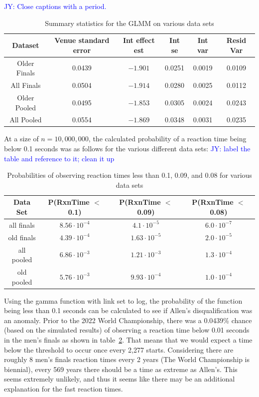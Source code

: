 \documentclass[12pt, letterpaper, titlepage]{article}
\newcommand{\jy}[1]{\textcolor{blue}{JY: #1}}
\begin{document}
\jy{Close captions with a period.}
\begin{table}
  \centering
  \begin{tabular}{c c c c c c}
      \toprule
      Dataset & Venue standard error & Int effect est & Int se & Int var & Resid Var \\
      \midrule
      Older Finals & 0.0439 & $-1.901$ & 0.0251 & 0.0019 & 0.0109 \\
      All Finals & 0.0504 & $-1.914$ & 0.0280 & 0.0025 & 0.0112 \\
      Older Pooled & 0.0495 & $-1.853$ & 0.0305 & 0.0024 & 0.0243 \\
      All Pooled & 0.0554 & $-1.869$ & 0.0348 & 0.0031 & 0.0235 \\
      \bottomrule
  \end{tabular}
  \caption{Summary statistics for the GLMM on various data sets}
  \label{tab:Gamma_parameters}
\end{table}

At a size of $n=10,000,000$, the calculated probability of a reaction
time being below 0.1 seconds was as follows for the various different data sets:
\jy{label the table and reference to it; clean it up}
\begin{table}
  \centering
  \begin{tabular}{c c c c} 
   \toprule
   Data Set & P(RxnTime $<$ 0.1) & P(RxnTime $<$ 0.09) & P(RxnTime $<$ 0.08) \\ 
   \midrule
   all finals & $8.56\cdot10^{-4}$ & $4.1\cdot10^{-5}$ & $6.0\cdot10^{-7}$ \\ 
   old finals & $4.39\cdot10^{-4}$ & $1.63\cdot10^{-5}$ & $2.0\cdot10^{-5}$ \\
   all pooled & $6.86\cdot10^{-3}$ & $1.21\cdot10^{-3}$ & $1.3\cdot10^{-4}$ \\
   old pooled & $5.76\cdot10^{-3}$ & $9.93\cdot10^{-4}$ & $1.0\cdot10^{-4}$\\
   \bottomrule
  \end{tabular}
  \caption{Probabilities of observing reaction times less than 0.1, 0.09, and
  0.08 for various data sets}
  \label{tab:Sim_probability}
\end{table}

Using the gamma function with link set to log, the probability of the function being
less than 0.1 seconds can be calculated to see if Allen's disqualification was an anomaly.
Prior to the 2022 World Championship, there was a 0.0439\% chance (based on the
simulated results) of observing a reaction time below 0.01 seconds in the men's
finals as shown in table~\ref{tab:Sim_probability}.
That means that we would expect a time below the threshold to occur
once every 2,277 starts.  Considering there are roughly 8 men's finals reaction
times every 2 years (The World Championship is biennial), every 569 years there
should be a time as extreme as Allen's.  This seems extremely unlikely, and thus
it seems like there may be an additional explanation for the fast reaction times.
\end{document}

